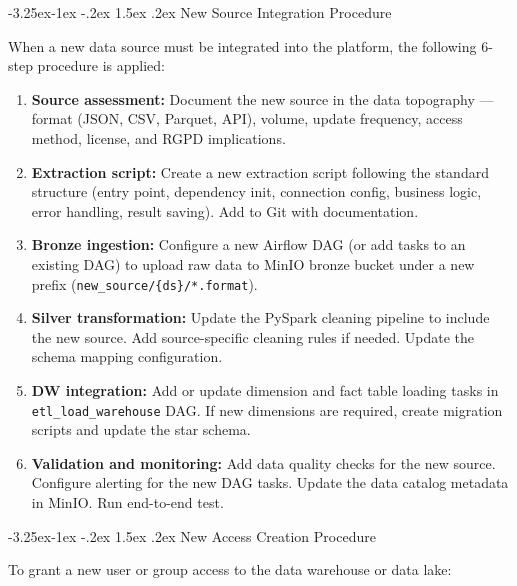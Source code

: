 \documentclass[a4paper,11pt,oneside,openany]{report}
\makeatletter
\renewcommand\subsection{\@startsection{subsection}{2}{\z@}%
  {-3.25ex\@plus -1ex \@minus -.2ex}%
  {1.5ex \@plus .2ex}%
  {\normalfont\large\bfseries\color{ntdarkgreen}}}
\newcommand{\rgpd}{RGPD}
\makeatother
\begin{document}
\subsection{New Source Integration Procedure}

When a new data source must be integrated into the platform, the following
6-step procedure is applied:

\begin{enumerate}[nosep]
  \item \textbf{Source assessment:} Document the new source in the data
        topography --- format (JSON, CSV, Parquet, API), volume, update
        frequency, access method, license, and \rgpd{} implications.
  \item \textbf{Extraction script:} Create a new extraction script following
        the standard structure (entry point, dependency init, connection
        config, business logic, error handling, result saving). Add to
        Git with documentation.
  \item \textbf{Bronze ingestion:} Configure a new Airflow DAG (or add tasks
        to an existing DAG) to upload raw data to MinIO bronze bucket under
        a new prefix (\texttt{new\_source/\{ds\}/*.format}).
  \item \textbf{Silver transformation:} Update the PySpark cleaning pipeline
        to include the new source. Add source-specific cleaning rules if needed.
        Update the schema mapping configuration.
  \item \textbf{DW integration:} Add or update dimension and fact table
        loading tasks in \texttt{etl\_load\_warehouse} DAG. If new dimensions
        are required, create migration scripts and update the star schema.
  \item \textbf{Validation and monitoring:} Add data quality checks for the
        new source. Configure alerting for the new DAG tasks. Update the
        data catalog metadata in MinIO. Run end-to-end test.
\end{enumerate}

\subsection{New Access Creation Procedure}

To grant a new user or group access to the data warehouse or data lake:
\end{document}
